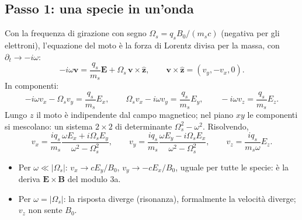 \subsection{Passo 1: una specie in un'onda}
Con la frequenza di girazione con segno $\Omega_s=q_sB_0/(m_sc)$ (negativa per gli elettroni), l'equazione del moto è la forza di Lorentz divisa per la massa, con $\partial_t\to-i\omega$:
\begin{equation}
-i\omega\mathbf{v}=\frac{q_s}{m_s}\mathbf{E}+\Omega_s\,\mathbf{v}\times\hat{\mathbf{z}},\qquad\mathbf{v}\times\hat{\mathbf{z}}=(v_y,-v_x,0).
\end{equation}
In componenti:
\begin{equation}
-i\omega v_x-\Omega_sv_y=\frac{q_s}{m_s}E_x,\qquad\Omega_sv_x-i\omega v_y=\frac{q_s}{m_s}E_y,\qquad-i\omega v_z=\frac{q_s}{m_s}E_z .
\end{equation}
Lungo $z$ il moto è indipendente dal campo magnetico; nel piano $xy$ le componenti si mescolano: un sistema $2\times2$ di determinante $\Omega_s^2-\omega^2$. Risolvendo,
\begin{equation}
v_x=\frac{iq_s}{m_s}\frac{\omega E_x+i\Omega_sE_y}{\omega^2-\Omega_s^2},\qquad v_y=\frac{iq_s}{m_s}\frac{\omega E_y-i\Omega_sE_x}{\omega^2-\Omega_s^2},\qquad v_z=\frac{iq_s}{m_s\omega}E_z .
\end{equation}
\begin{itemize}
\item Per $\omega\ll|\Omega_s|$: $v_x\to cE_y/B_0$, $v_y\to-cE_x/B_0$, uguale per tutte le specie: è la deriva $\mathbf{E}\times\mathbf{B}$ del modulo 3a.
\item Per $\omega=|\Omega_s|$: la risposta diverge (risonanza), formalmente la velocità diverge; $v_z$ non sente $B_0$.
\end{itemize}

